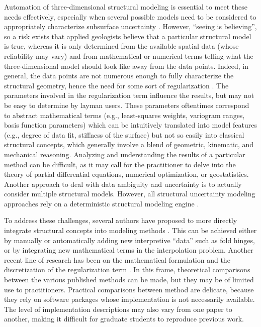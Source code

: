 \documentclass[preprint]{ring20}
\begin{document}
Automation of three-dimensional structural modeling is essential to meet these needs effectively, especially when several possible models need to be considered to appropriately characterize subsurface uncertainty \citep{Wellmann2018AiG}. However, ``seeing is believing'', so a risk exists that applied geologists believe that a particular structural model is true, whereas it is only determined from the available spatial data (whose reliability may vary) and from mathematical or numerical terms telling what the three-dimensional model should look like away from the data points. Indeed, in general, the data points are not numerous enough to fully characterize the structural geometry, hence the need for some sort of regularization \citep[e.g.,][]{Renaudeau2019MG}. The parameters involved in the regularization term influence the results, but may not be easy to determine by layman users. These parameters oftentimes correspond to abstract mathematical terms (e.g., least-squares weights, variogram ranges, basis function parameters) which can be intuitively translated into model features (e.g., degree of data fit, stiffness of the surface) but not so easily into classical structural concepts, which generally involve a blend of geometric, kinematic, and mechanical reasoning. Analyzing and understanding the results of a particular method can be difficult, as it may call for the practitioner to delve into the theory of partial differential equations, numerical optimization, or geostatistics. Another approach to deal with data ambiguity and uncertainty is to actually consider multiple structural models. However, all structural uncertainty modeling approaches rely on a deterministic structural modeling engine \citep[see ][ and references therein]{Wellmann2018AiG}.

To address these challenges, several authors have proposed to more directly integrate structural concepts into modeling methods \citep{DeKemp2003G,Maxelon2009CG,MassiotGM2010,Laurent2016EaPSL,Grose2017JSG,Grose2018JGRSE,Grose2019JoSG}. This can be achieved either by manually or automatically adding new interpretive ``data'' such as fold hinges, or by integrating new mathematical terms in the interpolation problem. Another recent line of research has been on the mathematical formulation and the discretization of the regularization term \citep{Laurent2016MG,Martin2017CG,Irakarama2018EAGE,Renaudeau2019MG}. In this frame, theoretical comparisons between the various published methods can be made, but they may be of limited use to practitioners. Practical comparisons between method are delicate, because they rely on software packages whose implementation is not necessarily available. The level of implementation descriptions may also vary from one paper to another, making it difficult for graduate students to reproduce previous work. 
\end{document}
